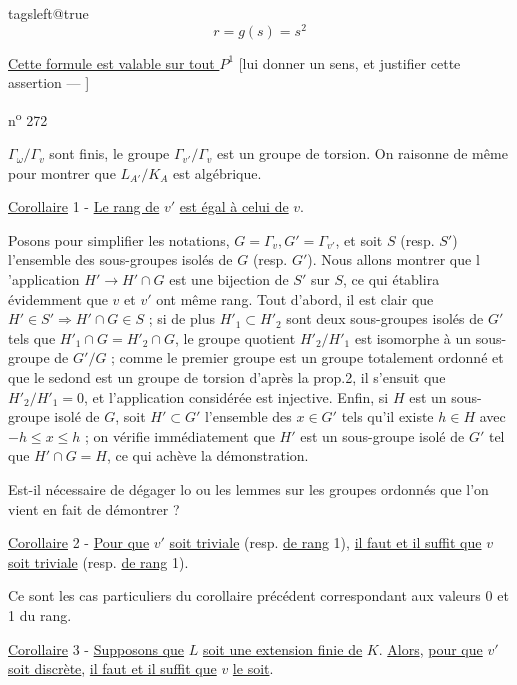 
\begingroup\csname tagsleft@true\endcsname
\[
r=g(s)=s^2 \tag*{(9)}
\]
\endgroup

\uline{Cette formule est valable sur tout $P^1$} [lui donner un sens, et justifier cette assertion --- ]

n\textsuperscript{o} 272

$\Gamma_\omega/\Gamma_v$ sont finis, le groupe $\Gamma_{v'}/\Gamma_v$ est un groupe de torsion. On raisonne de même pour montrer que $L_{A'}/K_A$ est algébrique.

\uline{Corollaire} 1 - \uline{Le rang de} $v'$ \uline{est égal à celui de} $v$.

Posons pour simplifier les notations, $G=\Gamma_v,G'=\Gamma_{v'}$, et soit $S$ (resp. $S'$) l'ensemble des sous-groupes isolés de $G$ (resp. $G'$). Nous allons montrer que l 'application $H'\longrightarrow H'\cap G$ est une bijection de $S'$ sur $S$, ce qui établira évidemment que $v$ et $v'$ ont même rang. Tout d'abord, il est clair que $H'\in S'\Rightarrow H'\cap G\in S$ ; si de plus $H'_1\subset H'_2$ sont deux sous-groupes isolés de $G'$ tels que $H'_1\cap G=H'_2\cap G$, le groupe quotient $H'_2/H'_1$ est isomorphe à un sous-groupe de $G'/G$ ; comme le premier groupe est un groupe totalement ordonné et que le sedond est un groupe de torsion d'après la prop.2, il s'ensuit que $H'_2/H'_1=0$, et l'application considérée est injective. Enfin, si $H$ est un sous-groupe isolé de $G$, soit $H'\subset G'$ l'ensemble des $x\in G'$ tels qu'il existe $h\in H$ avec $-h\leq x\leq h$ ; on vérifie immédiatement que $H'$ est un sous-groupe isolé de $G'$ tel que $H'\cap G=H$, ce qui achève la démonstration.

\handwritten{[}Est-il nécessaire de dégager lo ou les lemmes sur les groupes ordonnés que l'on vient en fait de démontrer ?\handwritten{]}

\uline{Corollaire} 2 - \uline{Pour que} $v'$ \uline{soit triviale} (resp. \uline{de rang} 1), \uline{il faut et il suffit que} $v$ \uline{soit triviale} (resp. \uline{de rang} 1).

Ce sont les cas particuliers du corollaire précédent correspondant aux valeurs 0 et 1 du rang.

\uline{Corollaire} 3 - \uline{Supposons que} $L$ \uline{soit une extension finie de} $K$. \uline{Alors}, \uline{pour que} $v'$ \uline{soit discrète}, \uline{il faut et il suffit que} $v$ \uline{le soit}.

